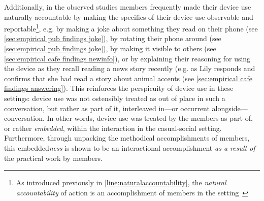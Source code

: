 \begin{revisedsubmission}
Additionally, in the observed studies members frequently made their device use naturally accountable by making the specifics of their device use observable and reportable\footnote{As introduced previously in \ref{line:naturalaccountability}, the \textit{natural accountability} of action is an accomplishment of members in the setting~\citep[pp. 1--34]{Garfinkel1967}}, e.g. by making a joke about something they read on their phone (see \ref{sec:empirical pub findings joke}), by rotating their phone around (see \ref{sec:empirical pub findings joke}), by making it visible to others (see \ref{sec:empirical cafe findings newinfo}), or by explaining their reasoning for using the device as they recall reading a news story recently (e.g. as Lily responds and confirms that she had read a story about animal accents (see \ref{sec:empirical cafe findings answering}).
This reinforces the perspicuity of device use in these settings: device use was not ostensibly treated as out of place in such a conversation, but rather as part of it, interleaved in---or occurrent alongside---conversation.
In other words, device use was treated by the members as part of, or rather \textit{embedded}, within the interaction in the casual-social setting.
Furthermore, through unpacking the methodical accomplishments of members, this embedded\textit{ness} is shown to be an interactional accomplishment \textit{as a result of} the practical work by members.



\end{revisedsubmission}
